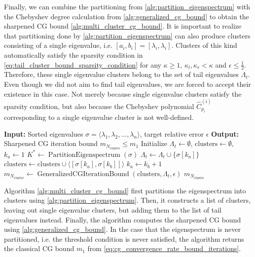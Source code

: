 Finally, we can combine the partitioning from \cref{alg:partition_eigenspectrum} with the Chebyshev degree calculation from \cref{alg:generalized_cg_bound} to obtain the sharpened CG bound \cref{alg:multi_cluster_cg_bound}. It is important to realize that partitioning done by \cref{alg:partition_eigenspectrum} can also produce clusters consisting of a single eigenvalue, i.e. $[a_i, b_i] = [\lambda_i, \lambda_i]$. Clusters of this kind automatically satisfy the sparsity condition in \cref{eq:tail_cluster_bound_sparsity_condition} for any $\kappa\geq1$, $\kappa_l,\kappa_r<\kappa$ and $\epsilon\leq\frac{1}{2}$. Therefore, these single eigenvalue clusters belong to the set of tail eigenvalues $\Lambda_t$. Even though we did not aim to find tail eigenvalues, we are forced to accept their existence in this case. Not merely because single eigenvalue clusters satisfy the sparsity condition, but also because the Chebyshev polynomial $\hat{C}^{(i)}_{p_i}$ corresponding to a single eigenvalue cluster is not well-defined.
\begin{algorithm}[H]
    \caption{$\operatorname{MultiClusterCGIterationBound}(\sigma, \epsilon)$}
    \begin{algorithmic}[1]
        \State \textbf{Input:} Sorted eigenvalues $\sigma = \langle\lambda_1, \lambda_2, \ldots, \lambda_n\rangle$, target relative error $\epsilon$
        \State \textbf{Output:} Sharpened CG iteration bound $m_{N_{\text{cluster}}} \leq m_1$
        \State Initialize $\Lambda_t \gets \emptyset$, $\text{clusters} \gets \emptyset$, $k_a \gets 1$
        \State $K^* \gets \operatorname{PartitionEigenspectrum}(\sigma)$
            \State $\Lambda_t \gets \Lambda_t \cup \{\sigma[k_a]\}$ 
        \Else
            \State $\text{clusters} \gets \text{clusters} \cup \langle[\sigma[k_a], \sigma[k_b]]\rangle$
        \EndIf
        \State $k_a \gets k_b + 1$
        \EndFor
        \State $m_{N_{\text{cluster}}} \gets \operatorname{GeneralizedCGIterationBound}(\text{clusters}, \Lambda_t, \epsilon)$
        \State \Return $m_{N_{\text{cluster}}}$
    \end{algorithmic}
    \label{alg:multi_cluster_cg_bound}
\end{algorithm}
Algorithm \ref{alg:multi_cluster_cg_bound} first partitions the eigenspectrum into clusters using \cref{alg:partition_eigenspectrum}. Then, it constructs a list of clusters, leaving out single eigenvalue clusters, but adding them to the list of tail eigenvalues instead. Finally, the algorithm computes the sharpened CG bound using \cref{alg:generalized_cg_bound}. In the case that the eigenspectrum is never partitioned, i.e. the threshold condition is never satisfied, the algorithm returns the classical CG bound $m_1$ from \cref{eq:cg_convergence_rate_bound_iterations}.

